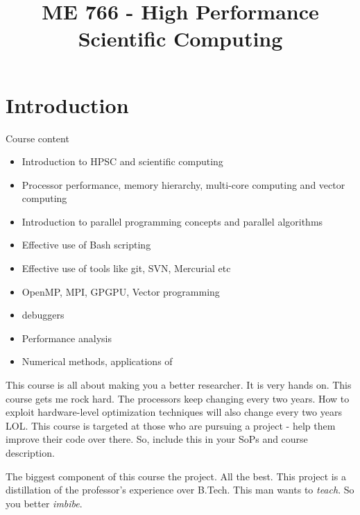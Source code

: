 \documentclass[a4paper]{article}
\title{ME 766 - High Performance Scientific Computing}
\begin{document}
\section{Introduction}
Course content
\begin{itemize}
	\item Introduction to HPSC and scientific computing
	\item Processor performance, memory hierarchy, multi-core computing and vector computing
	\item Introduction  to parallel programming concepts and parallel algorithms
	\item Effective use of Bash scripting
	\item Effective use of tools like git, SVN, Mercurial etc
	\item OpenMP, MPI, GPGPU, Vector programming
	\item debuggers
	\item Performance analysis
	\item Numerical methods, applications of 
\end{itemize}

This course is all about making you a better researcher. It
is very hands on. This course
gets me rock hard. The processors keep changing every two years.
How to exploit hardware-level optimization techniques will also
change every two years LOL. This course is targeted at those who are
pursuing a project - help them improve their code over there. So,
include this in your SoPs and course description. 

The biggest component of this course the project. All the best.
This project is a distillation of the professor's experience over
B.Tech. This man wants to \emph{teach}. So you better \emph{imbibe}. 
\end{document}
